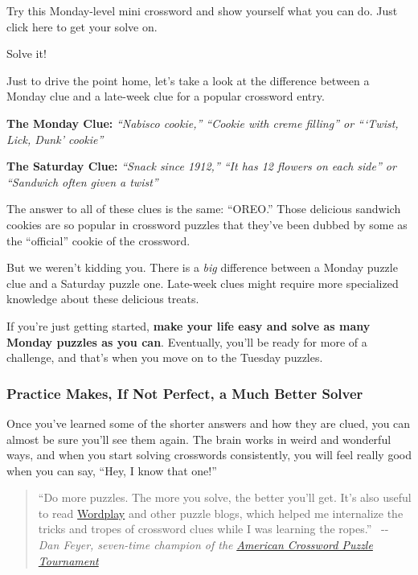Try this Monday-level mini crossword and show yourself what you can do.
Just click here to get your solve on.

Solve it!

Just to drive the point home, let's take a look at the difference
between a Monday clue and a late-week clue for a popular crossword
entry.~

\textbf{The Monday Clue:} \emph{``Nabisco cookie,'' ``Cookie with creme
filling'' or ```Twist, Lick, Dunk' cookie''}

\textbf{The Saturday Clue:} \emph{``Snack since 1912,'' ``It has 12
flowers on each side'' or ``Sandwich often given a twist''}

The answer to all of these clues is the same: ``OREO.'' Those delicious
sandwich cookies are so popular in crossword puzzles that they've been
dubbed by some as the ``official'' cookie of the crossword.

But we weren't kidding you. There is a \emph{big} difference between a
Monday puzzle clue and a Saturday puzzle one. Late-week clues might
require more specialized knowledge about these delicious treats.

If you're just getting started, \textbf{make your life easy and solve as
many Monday puzzles as you can}. Eventually, you'll be ready for more of
a challenge, and that's when you move on to the Tuesday puzzles.

\hypertarget{practice-makes-if-not-perfect-a-much-better-solver}{%
\subsubsection{Practice Makes, If Not Perfect, a Much Better
Solver}\label{practice-makes-if-not-perfect-a-much-better-solver}}

Once you've learned some of the shorter answers and how they are clued,
you can almost be sure you'll see them again. The brain works in weird
and wonderful ways, and when you start solving crosswords consistently,
you will feel really good when you can say, ``Hey, I know that one!''

\begin{quote}
``Do more puzzles. The more you solve, the better you'll get. It's also
useful to read \href{https://www.nytimes.com/column/wordplay}{Wordplay}
and other puzzle blogs, which helped me internalize the tricks and
tropes of crossword clues while I was learning the ropes.'' ~-\/-
\emph{Dan Feyer, seven-time champion of the}
\href{http://www.crosswordtournament.com/}{\emph{American Crossword
Puzzle Tournament}}
\end{quote}

